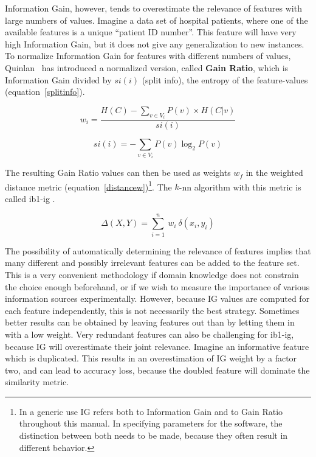 \documentclass{report}
\begin{document}
Information Gain, however, tends to overestimate the relevance of
features with large numbers of values. Imagine a data set of hospital
patients, where one of the available features is a unique ``patient ID
number''. This feature will have very high Information Gain, but it
does not give any generalization to new instances. To normalize
Information Gain for features with different numbers of values,
Quinlan~\cite{Quinlan93} has introduced a normalized version, called
{\bf Gain Ratio}, which is Information Gain divided by $si(i)$ (split info),
the entropy of the feature-values (equation~\ref{splitinfo}).

\begin{equation}
w_{i} = \frac{H(C) -  \sum_{v \in V_{i}} P(v) \times H(C|v)}{si(i)}
\label{IGgainratio}
\end{equation}

\begin{equation}
si(i) = - \sum_{v \in V_{i}} P(v) \log_{2} P(v)
\label{splitinfo}
\end{equation}

The resulting Gain Ratio values can then be used as weights $w_{f}$ in
the weighted distance metric (equation~\ref{distancew})\footnote{In a
generic use IG refers both to Information Gain and to Gain Ratio
throughout this manual. In specifying parameters for the software, the
distinction between both needs to be made, because they often result
in different behavior.}. The $k$-{\sc nn} algorithm with this
metric is called {\sc ib1-ig} \cite{Daelemans+92b}.

\begin{equation}
\Delta(X,Y) = \sum_{i=1}^{n}\ w_{i} \ \delta(x_{i},y_{i})
\label{distancew}
\end{equation} 

The possibility of automatically determining the relevance of features
implies that many different and possibly irrelevant features can be
added to the feature set. This is a very convenient methodology if
domain knowledge does not constrain the choice enough beforehand, or
if we wish to measure the importance of various information sources
experimentally. However, because IG values are computed for each
feature independently, this is not necessarily the best
strategy. Sometimes better results can be obtained by leaving features
out than by letting them in with a low weight. Very redundant features
can also be challenging for {\sc ib1-ig}, because IG will overestimate
their joint relevance. Imagine an informative feature which is
duplicated. This results in an overestimation of IG weight by a factor
two, and can lead to accuracy loss, because the doubled feature will
dominate the similarity metric.
\end{document}
